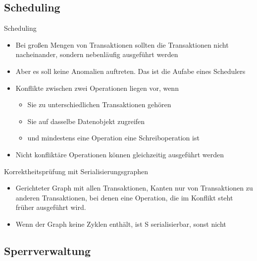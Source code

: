 \documentclass{article}
\begin{document}
\subsection*{Scheduling}
\begin{block}{Scheduling}
  \begin{itemize}
    \item Bei großen Mengen von Transaktionen sollten die Transaktionen nicht nacheinander, sondern nebenläufig ausgeführt werden
    \item Aber es soll keine Anomalien auftreten. Das ist die Aufabe eines Schedulers
    \item Konflikte zwischen zwei Operationen liegen vor, wenn
    \begin{itemize}
      \item Sie zu unterschiedlichen Transaktionen gehören
      \item Sie auf dasselbe Datenobjekt zugreifen
      \item und mindestens eine Operation eine Schreiboperation ist
    \end{itemize}
    \item Nicht konfliktäre Operationen können gleichzeitig ausgeführt werden
  \end{itemize}
\end{block}

\begin{block}{Korrektheitsprüfung mit Serialisierungsgraphen}
  \begin{itemize}
    \item Gerichteter Graph mit allen Transaktionen, Kanten nur von Transaktionen zu anderen Transaktionen, bei denen eine Operation, die im Konflikt steht früher ausgeführt wird.
    \item Wenn der Graph keine Zyklen enthält, ist S serialisierbar, sonst nicht
  \end{itemize}
\end{block}

\subsection*{Sperrverwaltung}
\end{document}
